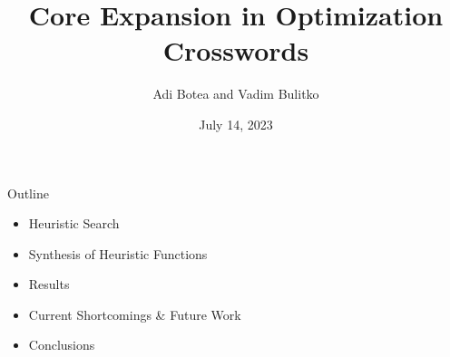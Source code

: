 \documentclass[aspectratio=169,usenames,dvipsnames]{beamer}
\newcommand{\bei}{\begin{itemize}}
\newcommand{\eei}{\end{itemize}}
\newcommand{\ie}{\item}
\numberwithin{equation}{section}
\numberwithin{theorem}{section}
\numberwithin{lem}{section}
\numberwithin{df}{section}
\begin{document}
\title{Core Expansion in Optimization Crosswords}
\author{Adi Botea and Vadim Bulitko}

\date{July 14, 2023}

\frame{\titlepage} 


\begin{frame}{Outline}

\bei

\ie Heuristic Search

\bigskip

\ie Synthesis of Heuristic Functions

\bigskip

\ie Results

\bigskip

\ie Current Shortcomings \& Future Work

\bigskip

\ie Conclusions

\eei

\end{frame}

\end{document}

